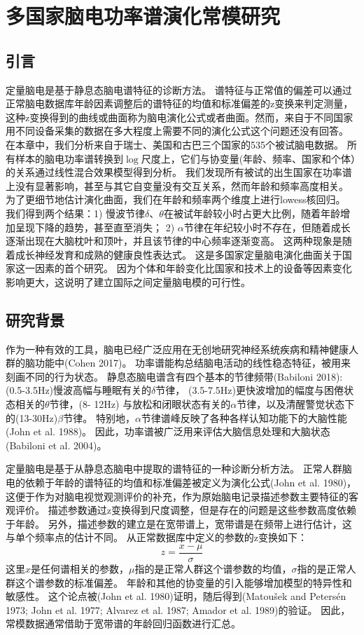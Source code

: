 \chapter{多国家脑电功率谱演化常模研究}

\section{引言}
定量脑电是基于静息态脑电谱特征的诊断方法。 谱特征与正常值的偏差可以通过正常脑电数据库年龄因素调整后的谱特征的均值和标准偏差的z变换来判定测量，这种z变换得到的曲线或曲面称为脑电演化公式或者曲面。然而，来自于不同国家用不同设备采集的数据在多大程度上需要不同的演化公式这个问题还没有回答。 在本章中，我们分析来自于瑞士、美国和古巴三个国家的535个被试脑电数据。 所有样本的脑电功率谱转换到$\log$尺度上，它们与协变量(年龄、频率、国家和个体）的关系通过线性混合效果模型得到分析。 我们发现所有被试的出生国家在功率谱上没有显著影响，甚至与其它自变量没有交互关系，然而年龄和频率高度相关。 为了更细节地估计演化曲面，我们在年龄和频率两个维度上进行lowess核回归。 我们得到两个结果：1) 慢波节律$\delta$、$\theta$在被试年龄较小时占更大比例，随着年龄增加呈现下降的趋势，甚至直至消失； 2) $\alpha$节律在年纪较小时不存在，但随着成长逐渐出现在大脑枕叶和顶叶，并且该节律的中心频率逐渐变高。 这两种现象是随着成长神经发育和成熟的健康良性表达式。 这是多国家定量脑电演化曲面关于国家这一因素的首个研究。 因为个体和年龄变化比国家和技术上的设备等因素变化影响更大，这说明了建立国际之间定量脑电模的可行性。

\section{研究背景}
作为一种有效的工具，脑电已经广泛应用在无创地研究神经系统疾病和精神健康人群的脑功能中\citing{}(Cohen 2017)。 功率谱能构总结脑电活动的线性稳态特征，被用来刻画不同的行为状态。 静息态脑电谱含有四个基本的节律频带\citing{}(Babiloni
2018):  (0.5-3.5Hz)慢波高幅与睡眠有关的$\delta$节律， (3.5-7.5Hz)更快波增加的幅度与困倦状态相关的$\theta$节律，(8-
12Hz) 与放松和闭眼状态有关的$\alpha$节律，以及清醒警觉状态下的(13-30Hz)$\beta$节律。 特别地，$\alpha$节律谱峰反映了各种各样认知功能下的大脑性能\citing(John et al. 1988)。 因此，功率谱被广泛用来评估大脑信息处理和大脑状态\citing(Babiloni et al. 2004)。

定量脑电是基于从静息态脑电中提取的谱特征的一种诊断分析方法。 正常人群脑电的依赖于年龄的谱特征的均值和标准偏差被定义为演化公式\citing(John et al. 1980)，这便于作为对脑电视觉观测评价的补充，作为原始脑电记录描述参数主要特征的客观评价。 描述参数通过z变换得到尺度调整，但是存在的问题是这些参数高度依赖于年龄。 另外，描述参数的建立是在宽带谱上，宽带谱是在频带上进行估计，这与单个频率点的估计不同。 从正常数据库中定义的参数的z变换如下：
\[z=\frac{x-\mu}{\sigma}\]
这里$x$是任何谱相关的参数，$\mu$指的是正常人群这个谱参数的均值，$\sigma$指的是正常人群这个谱参数的标准偏差。 年龄和其他的协变量的引入能够增加模型的特异性和敏感性。 这个论点被\cite{}(John et al. 1980)证明，随后得到\cite{}(Matoušek and Petersén 1973; John et al. 1977; Alvarez et al. 1987; Amador et al. 1989)的验证。 因此，常模数据通常借助于宽带谱的年龄回归函数进行汇总。

